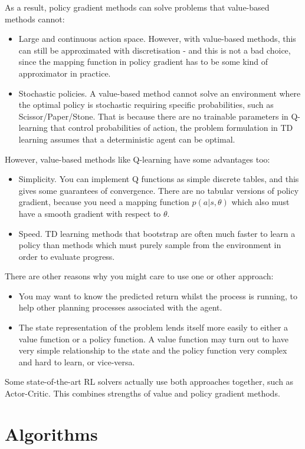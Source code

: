 \documentclass[lang=en,mode=normal,device=normal,color=blue,12pt]{elegantnote}
\DeclareMathOperator*{\1}{\mathbbm{1}}
\begin{document}
As a result, policy gradient methods can solve problems that value-based methods cannot:
\begin{itemize}
\item Large and continuous action space. However, with value-based methods, this can still be approximated with discretisation - and this is not a bad choice, since the mapping function in policy gradient has to be some kind of approximator in practice.
\item Stochastic policies. A value-based method cannot solve an environment where the optimal policy is stochastic requiring specific probabilities, such as Scissor/Paper/Stone. That is because there are no trainable parameters in Q-learning that control probabilities of action, the problem formulation in TD learning assumes that a deterministic agent can be optimal.
\end{itemize}
However, value-based methods like Q-learning have some advantages too:
\begin{itemize}
\item Simplicity. You can implement Q functions as simple discrete tables, and this gives some guarantees of convergence. There are no tabular versions of policy gradient, because you need a mapping function $p(a|s,\theta)$ which also must have a smooth gradient with respect to $\theta$.
\item Speed. TD learning methods that bootstrap are often much faster to learn a policy than methods which must purely sample from the environment in order to evaluate progress.
\end{itemize}
There are other reasons why you might care to use one or other approach:
\begin{itemize}
\item You may want to know the predicted return whilst the process is running, to help other planning processes associated with the agent.
\item The state representation of the problem lends itself more easily to either a value function or a policy function. A value function may turn out to have very simple relationship to the state and the policy function very complex and hard to learn, or vice-versa.
\end{itemize}

Some state-of-the-art RL solvers actually use both approaches together, such as Actor-Critic. This combines strengths of value and policy gradient methods.

\newpage

\section{Algorithms}
\end{document}
